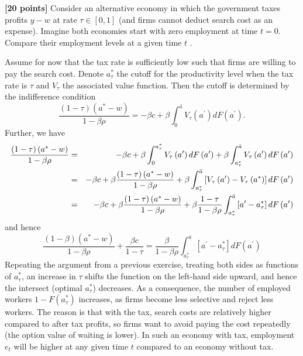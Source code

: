 \documentclass[11pt]{article}
\newenvironment{question}[1][Question]{}{}
\newenvironment{answer}[1][Answer]{}{}
\begin{document}
\begin{question}
\textbf{[20 points]} Consider an alternative economy in which the government
taxes profits $y-w$ at rate $\tau \in \left[ 0,1\right] $ (and firms cannot
deduct search cost as an expense). Imagine both economies start with zero
employment at time $t=0$. Compare their employment levels at a given time $t$%
.

\begin{answer}
Assume for now that the tax rate is sufficiently low such that firms are
willing to pay the search cost. Denote $a_{\tau }^{\ast }$ the cutoff for
the productivity level when the tax rate is $\tau $ and $V_{\tau }$ the
associated value function. Then the cutoff is determined by the indifference
condition%
\begin{equation*}
\frac{\left( 1-\tau \right) \left( a^{\ast }-w\right) }{1-\beta \rho }%
=-\beta c+\beta \int_{0}^{\bar{a}}V_{\tau }\left( a^{\prime }\right)
dF\left( a^{\prime }\right) .
\end{equation*}%
Further, we have%
\begin{eqnarray*}
\frac{\left( 1-\tau \right) \left( a^{\ast }-w\right) }{1-\beta \rho }
&=&-\beta c+\beta \int_{0}^{a_{\tau }^{\ast }}V_{\tau }\left( a^{\prime
}\right) dF\left( a^{\prime }\right) +\beta \int_{a_{\tau }^{\ast }}^{\bar{a}%
}V_{\tau }\left( a^{\prime }\right) dF\left( a^{\prime }\right)  \\
&=&-\beta c+\beta \frac{\left( 1-\tau \right) \left( a^{\ast }-w\right) }{%
1-\beta \rho }+\beta \int_{a_{\tau }^{\ast }}^{\bar{a}}\left[ V_{\tau
}\left( a^{\prime }\right) -V_{\tau }\left( a^{\ast }\right) \right]
dF\left( a^{\prime }\right)  \\
&=&-\beta c+\beta \frac{\left( 1-\tau \right) \left( a^{\ast }-w\right) }{%
1-\beta \rho }+\beta \frac{1-\tau }{1-\beta \rho }\int_{a_{\tau }^{\ast }}^{%
\bar{a}}\left[ a^{\prime }-a_{\tau }^{\ast }\right] dF\left( a^{\prime
}\right)
\end{eqnarray*}%
and hence%
\begin{equation*}
\frac{\left( 1-\beta \right) \left( a^{\ast }-w\right) }{1-\beta \rho }+%
\frac{\beta c}{1-\tau }=\frac{\beta }{1-\beta \rho }\int_{a_{\tau }^{\ast
}}^{\bar{a}}\left[ a^{\prime }-a_{\tau }^{\ast }\right] dF\left( a^{\prime
}\right)
\end{equation*}%
Repeating the argument from a previous exercise, treating both sides as
functions of $a_{\tau }^{\ast }$, an increase in $\tau $ shifts the function
on the left-hand side upward, and hence the intersect (optimal $a_{\tau
}^{\ast }$) decreases. As a consequence, the number of employed workers $%
1-F\left( a_{\tau }^{\ast }\right) $ increases, as firms become less
selective and reject less workers. The reason is that with the tax, search
costs are relatively higher compared to after tax profits, so firms want to
avoid paying the cost repeatedly (the option value of waiting is lower). In
such an economy with tax, employment $e_{t}$ will be higher at any given
time $t$ compared to an economy without tax.


\end{answer}
\end{question}
\end{document}
